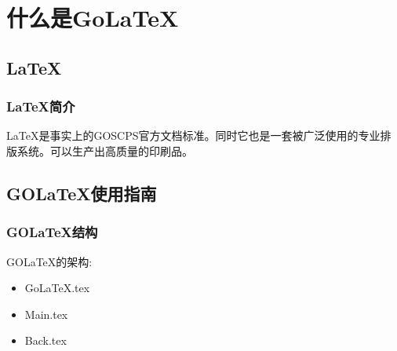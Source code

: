 \chapter{什么是Go\LaTeX{}}
\section{\LaTeX{}}
\subsection{\LaTeX{}简介}
\LaTeX{}是事实上的GOSCPS官方文档标准。同时它也是一套被广泛使用的专业排版系统。可以生产出高质量的印刷品。
\section{GO\LaTeX{}使用指南}
\subsection{GO\LaTeX{}结构}
GO\LaTeX{}的架构:\newline{}
\begin{itemize}
    \item Go\LaTeX{}.tex
    \item Main.tex
    \item Back.tex
\end{itemize}